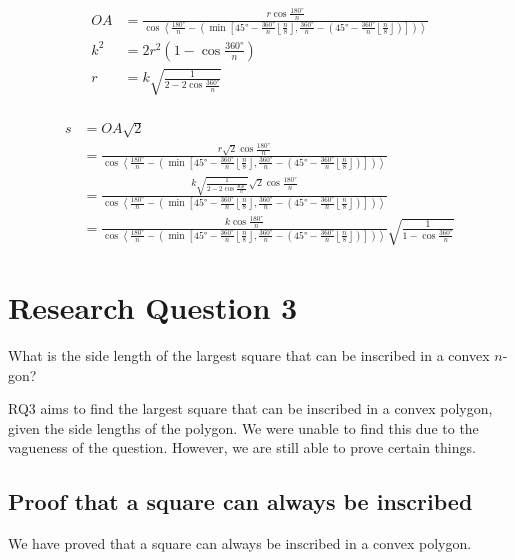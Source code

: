 \documentclass[12pt]{scrartcl}
\begin{document}
\begin{align*}
	OA & = \frac{r \cos \frac{\ang{180}}{n}}{\cos \left\langle\frac{\ang{180}}{n} - \left(\min\left[\ang{45} - \frac{\ang{360}}{n}\left\lfloor \frac{n}{8} \right\rfloor, \frac{\ang{360}}{n} - \left(\ang{45} - \frac{\ang{360}}{n}\left\lfloor \frac{n}{8}\right \rfloor\right)\right]\right)\right\rangle}  \\
	k^2 & = 2r^2 \left(1 - \cos \frac{\ang{360}}{n}\right)  \\
	r & = k\sqrt{\frac{1}{2 - 2\cos\frac{\ang{360}}{n}}}  \\
\end{align*}

\begin{align*}
	s & = OA\sqrt{2} \\
	& = \frac{r \sqrt{2} \cos \frac{\ang{180}}{n}}{\cos \left\langle\frac{\ang{180}}{n} - \left(\min\left[\ang{45} - \frac{\ang{360}}{n}\left\lfloor \frac{n}{8} \right\rfloor, \frac{\ang{360}}{n} - \left(\ang{45} - \frac{\ang{360}}{n}\left\lfloor \frac{n}{8}\right\rfloor\right)\right]\right)\right\rangle}  \\
	& = \frac{k\sqrt{\frac{1}{2 - 2\cos\frac{\ang{360}}{n}}} \sqrt{2} \cos \frac{\ang{180}}{n}}{\cos \left\langle\frac{\ang{180}}{n} - \left(\min\left[\ang{45} - \frac{\ang{360}}{n}\left\lfloor \frac{n}{8} \right\rfloor, \frac{\ang{360}}{n} - \left(\ang{45} - \frac{\ang{360}}{n}\left\lfloor \frac{n}{8} \right\rfloor\right)\right]\right)\right\rangle}  \\
	& = \frac{k \cos \frac{\ang{180}}{n}}{\cos \left\langle\frac{\ang{180}}{n} - \left(\min\left[\ang{45} - \frac{\ang{360}}{n}\left\lfloor \frac{n}{8} \right\rfloor, \frac{\ang{360}}{n} - \left(\ang{45} - \frac{\ang{360}}{n}\left\lfloor \frac{n}{8} \right\rfloor\right)\right]\right)\right\rangle} \sqrt{\frac{1}{1 - \cos\frac{\ang{360}}{n}}}
\end{align*}

\section{Research Question 3}
What is the side length of the largest square that can be inscribed in a convex $n$-gon?

RQ3 aims to find the largest square that can be inscribed in a convex polygon, given the side lengths of the polygon.
We were unable to find this due to the vagueness of the question. However, we are still able to prove certain things.

\subsection{Proof that a square can always be inscribed}
We have proved that a square can always be inscribed in a convex polygon.
\end{document}
